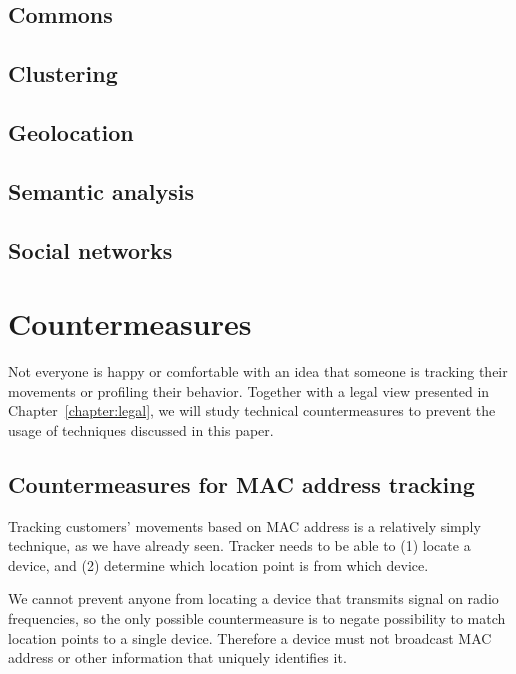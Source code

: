 \documentclass[12pt,a4paper,oneside,pdftex]{report}
\begin{document}
\section{Commons}
\label{sec:practical_commons}

\section{Clustering}
\label{sec:practical_clustering}

\section{Geolocation}
\label{sec:practical_geo}

\section{Semantic analysis}
\label{sec:practical_semantic}

\section{Social networks}
\label{sec:practical_social}





\chapter{Countermeasures}
\label{chapter:countermeasures}

Not everyone is happy or comfortable with an idea that someone is tracking their movements or profiling their behavior. Together with a legal view presented in Chapter~\ref{chapter:legal}, we will study technical countermeasures to prevent the usage of techniques discussed in this paper. 

\section{Countermeasures for MAC address tracking}

Tracking customers' movements based on MAC address is a relatively simply technique, as we have already seen. Tracker needs to be able to (1) locate a device, and (2) determine which location point is from which device. 

We cannot prevent anyone from locating a device that transmits signal on radio frequencies, so the only possible countermeasure is to negate possibility to match location points to a single device. Therefore a device must not broadcast MAC address or other information that uniquely identifies it.
\end{document}

